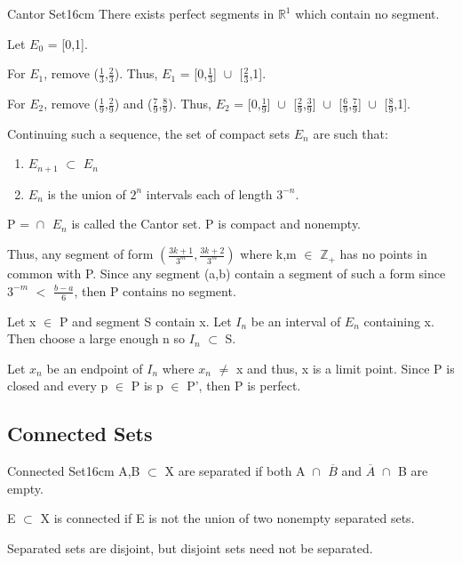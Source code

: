 	\begin{definition}{Cantor Set}{16cm}
		There exists perfect segments in $\mathbb{R}^1$ which contain no segment.

		Let $E_0$ = [0,1].

		For $E_1$, remove ($\frac{1}{3}$,$\frac{2}{3}$).
		Thus, $E_1$ = [0,$\frac{1}{3}$] $\cup_{}^{}$ [$\frac{2}{3}$,1].

		For $E_2$, remove ($\frac{1}{9}$,$\frac{2}{9}$) and ($\frac{7}{9}$,$\frac{8}{9}$).
		Thus, $E_2$ = [0,$\frac{1}{9}$] $\cup_{}^{}$ [$\frac{2}{9}$,$\frac{3}{9}$] $\cup_{}^{}$
		[$\frac{6}{9}$,$\frac{7}{9}$] $\cup_{}^{}$ [$\frac{8}{9}$,1].

		Continuing such a sequence, the set of compact sets $E_n$ are such that:

		\begin{enumerate}[label=(\alph*), leftmargin=2cm, itemsep=0.1cm]
			\item $E_{n+1}$ $\subset$ $E_n$
			\item $E_n$ is the union of $2^n$ intervals each of length $3^{-n}$.
		\end{enumerate}

		P = $\cap_{}^{}$ $E_n$ is called the Cantor set.
		P is compact and nonempty.

		Thus, any segment of form $(\frac{3k+1}{3^m},\frac{3k+2}{3^m})$
		where k,m $\in$ $\mathbb{Z}_+$ has no points in common with P.
		Since any segment (a,b) contain a segment of such a form since
		$3^{-m}$ $<$ $\frac{b-a}{6}$, then P contains no segment.

		Let x $\in$ P and segment S contain x. Let $I_n$ be an interval of
		$E_n$ containing x. Then choose a large enough n so $I_n$ $\subset$ S.
		
		Let $x_n$ be an endpoint of $I_n$ where $x_n$ $\not =$ x and thus,
		x is a limit point. Since P is closed and every p $\in$ P is p $\in$ P',
		then P is perfect.
	\end{definition}
	
	\vspace{0.5cm}





\subsection{ Connected Sets }

	\begin{definition}{Connected Set}{16cm}
		A,B $\subset$ X are {\color{lblue} separated} if both
		A $\cap_{}^{}$ $\overline{B}$ and
		$\overline{A}$ $\cap_{}^{}$ B are empty.

		E $\subset$ X is {\color{lblue} connected} if E is not the union
		of two nonempty separated sets.

		Separated sets are disjoint, but disjoint sets need not be separated.
	\end{definition}


